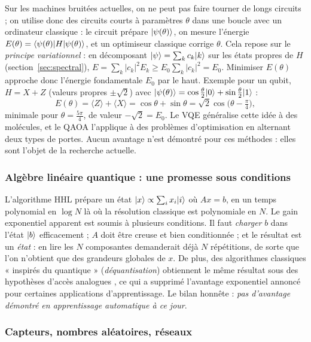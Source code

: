 Sur les machines bruitées actuelles, on ne peut pas faire tourner de longs circuits ; on utilise donc des circuits courts à paramètres
$\theta$ dans une boucle avec un ordinateur classique : le circuit prépare $|\psi(\theta)\rangle$, on mesure l'énergie
$E(\theta)=\langle \psi(\theta)|H|\psi(\theta)\rangle$, et un optimiseur classique corrige $\theta$. Cela repose sur le
\emph{principe variationnel} : en décomposant $|\psi\rangle=\sum_kc_k|k\rangle$ sur les états propres de $H$ (section~\ref{sec:spectral}),
$E=\sum_k|c_k|^2E_k\geq E_0\sum_k|c_k|^2=E_0$. Minimiser $E(\theta)$ approche donc l'énergie fondamentale $E_0$ par le haut. Exemple pour un qubit,
$H=X+Z$ (valeurs propres $\pm\sqrt2$) avec $|\psi(\theta)\rangle=\cos\frac\theta2|0\rangle+\sin\frac\theta2|1\rangle$ :
\[
  E(\theta)=\langle Z\rangle+\langle X\rangle=\cos\theta+\sin\theta=\sqrt2\cos\!\big(\theta-\tfrac\pi4\big),
\]
minimale pour $\theta=\frac{5\pi}{4}$, de valeur $-\sqrt2=E_0$. Le VQE \parencite{peruzzo2014} généralise cette idée à des molécules, et le QAOA
\parencite{farhi2014} l'applique à des problèmes d'optimisation en alternant deux types de portes. Aucun avantage n'est démontré pour ces méthodes :
elles sont l'objet de la recherche actuelle.

\subsubsection{Algèbre linéaire quantique : une promesse sous conditions}

L'algorithme HHL \parencite{harrow2009} prépare un état $|x\rangle\propto\sum_ix_i|i\rangle$ où $Ax=b$, en un temps polynomial en $\log N$
là où la résolution classique est polynomiale en $N$. Le gain exponentiel apparent est soumis à plusieurs conditions. Il faut
\emph{charger} $b$ dans l'état $|b\rangle$ efficacement ; $A$ doit être creuse et bien conditionnée ; et le résultat est un
\emph{état} : en lire les $N$ composantes demanderait déjà $N$ répétitions, de sorte que l'on n'obtient que des
grandeurs globales de $x$. De plus, des algorithmes classiques « inspirés du quantique » (\emph{déquantisation}) obtiennent le même
résultat sous des hypothèses d'accès analogues \parencite{tang2019}, ce qui a supprimé l'avantage exponentiel annoncé pour
certaines applications d'apprentissage. Le bilan honnête : \emph{pas d'avantage démontré en apprentissage automatique à ce jour}.

\subsubsection{Capteurs, nombres aléatoires, réseaux}

